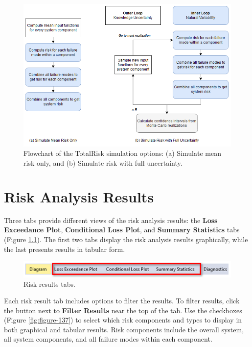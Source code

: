 \documentclass[
]{book}
\begin{document}
\begin{figure}

{\centering \includegraphics{images/risksimulation} 

}

\caption{Flowchart of the TotalRisk simulation options: (a) Simulate mean risk only, and (b) Simulate risk with full uncertainty.}\label{fig:figure-risksim}
\end{figure}

\hypertarget{risk-analysis-results}{%
\chapter{Risk Analysis Results}\label{risk-analysis-results}}

Three tabs provide different views of the risk analysis results: the \textbf{Loss Exceedance Plot}, \textbf{Conditional Loss Plot}, and \textbf{Summary Statistics} tabs (Figure \ref{fig:figure-136}). The first two tabs display the risk analysis results graphically, while the last presents results in tabular form.

\begin{figure}

{\centering \includegraphics{images/figure136} 

}

\caption{Risk results tabs.}\label{fig:figure-136}
\end{figure}

Each risk result tab includes options to filter the results. To filter results, click the button next to \textbf{Filter Results} near the top of the tab. Use the checkboxes (Figure \ref{fig:figure-137}) to select which risk components and types to display in both graphical and tabular results. Risk components include the overall system, all system components, and all failure modes within each component.
\end{document}

